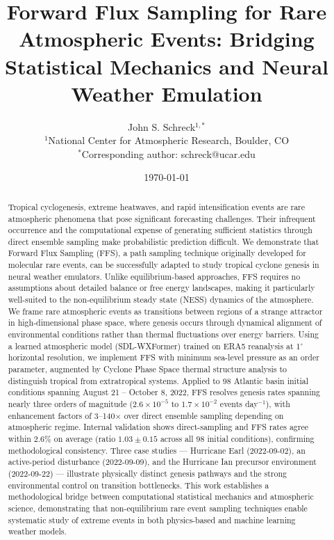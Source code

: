 \documentclass[11pt]{article}
\title{Forward Flux Sampling for Rare Atmospheric Events: Bridging Statistical Mechanics and Neural Weather Emulation}
\author{%
  John S. Schreck$^{1,*}$ \\
  \small $^1$National Center for Atmospheric Research, Boulder, CO \\
  \small $^*$Corresponding author: schreck@ucar.edu
}
\date{\today}
\begin{document}
\maketitle

\begin{abstract}
Tropical cyclogenesis, extreme heatwaves, and rapid intensification events are rare atmospheric phenomena that pose significant forecasting challenges. Their infrequent occurrence and the computational expense of generating sufficient statistics through direct ensemble sampling make probabilistic prediction difficult. We demonstrate that Forward Flux Sampling (FFS), a path sampling technique originally developed for molecular rare events, can be successfully adapted to study tropical cyclone genesis in neural weather emulators. Unlike equilibrium-based approaches, FFS requires no assumptions about detailed balance or free energy landscapes, making it particularly well-suited to the non-equilibrium steady state (NESS) dynamics of the atmosphere. We frame rare atmospheric events as transitions between regions of a strange attractor in high-dimensional phase space, where genesis occurs through dynamical alignment of environmental conditions rather than thermal fluctuations over energy barriers. Using a learned atmospheric model (SDL-WXFormer) trained on ERA5 reanalysis at 1$^\circ$ horizontal resolution, we implement FFS with minimum sea-level pressure as an order parameter, augmented by Cyclone Phase Space thermal structure analysis to distinguish tropical from extratropical systems. Applied to 98 Atlantic basin initial conditions spanning August 21 -- October 8, 2022, FFS resolves genesis rates spanning nearly three orders of magnitude ($2.6\times10^{-5}$ to $1.7\times10^{-2}$ events day$^{-1}$), with enhancement factors of 3--140$\times$ over direct ensemble sampling depending on atmospheric regime. Internal validation shows direct-sampling and FFS rates agree within 2.6\% on average (ratio $1.03 \pm 0.15$ across all 98 initial conditions), confirming methodological consistency. Three case studies --- Hurricane Earl (2022-09-02), an active-period disturbance (2022-09-09), and the Hurricane Ian precursor environment (2022-09-22) --- illustrate physically distinct genesis pathways and the strong environmental control on transition bottlenecks. This work establishes a methodological bridge between computational statistical mechanics and atmospheric science, demonstrating that non-equilibrium rare event sampling techniques enable systematic study of extreme events in both physics-based and machine learning weather models.

\end{abstract}
\end{document}
